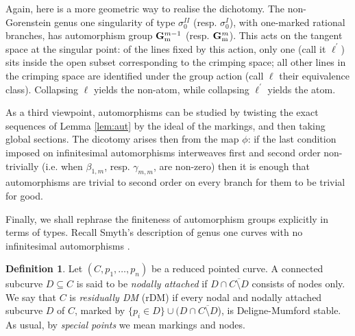 \documentclass{compositio}
\newcommand{\Gm}{\mathbb{G}_{\rm{m}}}
\theoremstyle{plain}
\theoremstyle{definition}
\newtheorem{definition}[thm]{Definition}
\theoremstyle{remark}
\begin{document}
Again, here is a more geometric way to realise the dichotomy. The non-Gorenstein genus one singularity of type $\sigma_0^{I\!I}$ (resp. $\sigma_0^{I}$), with one-marked rational branches, has automorphism group $\Gm^{m-1}$ (resp. $\Gm^m$). This acts on the tangent space at the singular point: of the lines fixed by this action, only one (call it $\ell^\prime$) sits inside the open subset corresponding to the crimping space; all other lines in the crimping space are identified under the group action (call $\ell$ their equivalence class). Collapsing $\ell$ yields the non-atom, while collapsing $\ell^\prime$ yields the atom.

As a third viewpoint, automorphisms can be studied by twisting the exact sequences of Lemma \ref{lem:aut} by the ideal of the markings, and then taking global sections. The dicotomy arises then from the map $\phi$: if the last condition imposed on infinitesimal automorphisms interweaves first and second order non-trivially (i.e. when $\beta_{1,m}$, resp. $\gamma_{m,m}$, are non-zero) then it is enough that automorphisms are trivial to second order on every branch for them to be trivial for good.

\smallskip

Finally, we shall rephrase the finiteness of automorphism groups explicitly in terms of types. Recall Smyth's description of genus one curves with no infinitesimal automorphisms \cite[Proposition 2.3, Corollary 2.4]{SMY1}.

\begin{definition}
 Let $(C,p_1,\ldots,p_n)$ be a reduced pointed curve. A connected subcurve $D\subseteq C$ is said to be \emph{nodally attached} if $D\cap\overline{C\setminus D}$ consists of nodes only.
  We say that $C$ is \emph{residually DM} (rDM) if every nodal and nodally attached subcurve $D$ of $C$, marked by $\{p_i\in D\}\cup (D\cap\overline{C\setminus D}$), is Deligne-Mumford stable. As usual, by \emph{special points} we mean markings and nodes.
\end{definition}
\end{document}
